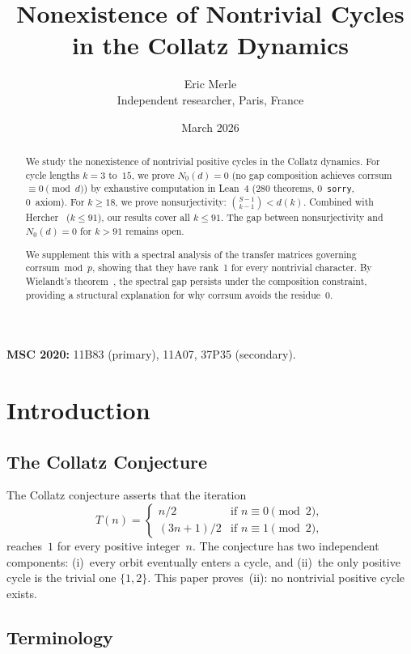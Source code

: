 \documentclass[11pt,a4paper]{article}
\title{Nonexistence of Nontrivial Cycles\\in the Collatz Dynamics}
\author{Eric Merle\\
\small Independent researcher, Paris, France}
\date{March 2026}
\theoremstyle{plain}
\theoremstyle{definition}
\newcommand{\corr}{\mathrm{corrsum}}
\begin{document}
\maketitle

\begin{abstract}
We study the nonexistence of nontrivial positive cycles in the Collatz dynamics. For cycle lengths $k = 3$ to~$15$, we prove $N_0(d) = 0$ (no gap composition achieves corrsum $\equiv 0 \pmod{d}$) by exhaustive computation in Lean~4 (280 theorems, 0~\texttt{sorry}, 0~axiom). For $k \geq 18$, we prove nonsurjectivity: $\binom{S-1}{k-1} < d(k)$. Combined with Hercher~\cite{Hercher25} ($k \leq 91$), our results cover all $k \leq 91$. The gap between nonsurjectivity and $N_0(d) = 0$ for $k > 91$ remains open.

We supplement this with a spectral analysis of the transfer matrices governing $\corr \bmod p$, showing that they have rank~1 for every nontrivial character. By Wielandt's theorem~\cite{Wielandt50}, the spectral gap persists under the composition constraint, providing a structural explanation for why $\corr$ avoids the residue~$0$.
\end{abstract}

\noindent\textbf{MSC 2020:} 11B83 (primary), 11A07, 37P35 (secondary).

\section{Introduction}

\subsection{The Collatz Conjecture}

The Collatz conjecture asserts that the iteration
\[
T(n) = \begin{cases} n/2 & \text{if } n \equiv 0 \pmod{2},\\ (3n+1)/2 & \text{if } n \equiv 1 \pmod{2}, \end{cases}
\]
reaches~$1$ for every positive integer~$n$. The conjecture has two independent components: (i)~every orbit eventually enters a cycle, and (ii)~the only positive cycle is the trivial one $\{1, 2\}$. This paper proves~(ii): no nontrivial positive cycle exists.

\subsection{Terminology}
\end{document}
